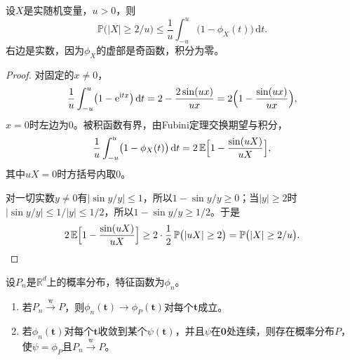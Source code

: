 \begin{lemma}[由特征函数控制尾概率]
\label{lem:weak-cf-tail}
设$X$是实随机变量，$u>0$，则
\begin{equation}
 \mathbb{P}\bigl(\lvert X\rvert\geq2/u\bigr)\leq\frac1u\int_{-u}^{u}\bigl(1-\phi_X(t)\bigr)\,\mathrm{d}t .
 \label{eq:weak-cf-tail}
\end{equation}
右边是实数，因为$\phi_X$的虚部是奇函数，积分为零。
\end{lemma}

\begin{proof}
对固定的$x\neq0$，
\[
 \frac1u\int_{-u}^{u}\bigl(1-\mathrm{e}^{\mathrm{i}tx}\bigr)\,\mathrm{d}t=2-\frac{2\sin(ux)}{ux}=2\Bigl(1-\frac{\sin(ux)}{ux}\Bigr) ,
\]
$x=0$时左边为$0$。被积函数有界，由Fubini定理交换期望与积分，
\[
 \frac1u\int_{-u}^{u}\bigl(1-\phi_X(t)\bigr)\,\mathrm{d}t=2\,\mathbb{E}\Bigl[1-\frac{\sin(uX)}{uX}\Bigr] ,
\]
其中$uX=0$时方括号内取$0$。

对一切实数$y\neq0$有$\lvert\sin y/y\rvert\leq1$，所以$1-\sin y/y\geq0$；当$\lvert y\rvert\geq2$时$\lvert\sin y/y\rvert\leq1/\lvert y\rvert\leq1/2$，所以$1-\sin y/y\geq1/2$。于是
\[
 2\,\mathbb{E}\Bigl[1-\frac{\sin(uX)}{uX}\Bigr]\geq2\cdot\frac12\,\mathbb{P}\bigl(\lvert uX\rvert\geq2\bigr)=\mathbb{P}\bigl(\lvert X\rvert\geq2/u\bigr) .
\]
\end{proof}

\begin{theorem}[连续性定理]
\label{thm:weak-continuity}
设$P_n$是$\mathbb{R}^{d}$上的概率分布，特征函数为$\phi_n$。
\begin{enumerate}
 \item 若$P_n\xrightarrow{\mathrm{w}}P$，则$\phi_n(\bm{t})\to\phi_P(\bm{t})$对每个$\bm{t}$成立。
 \item 若$\phi_n(\bm{t})$对每个$\bm{t}$收敛到某个$\psi(\bm{t})$，并且$\psi$在$\bm{0}$处连续，则存在概率分布$P$，使$\psi=\phi_P$且$P_n\xrightarrow{\mathrm{w}}P$。
\end{enumerate}
\end{theorem}

